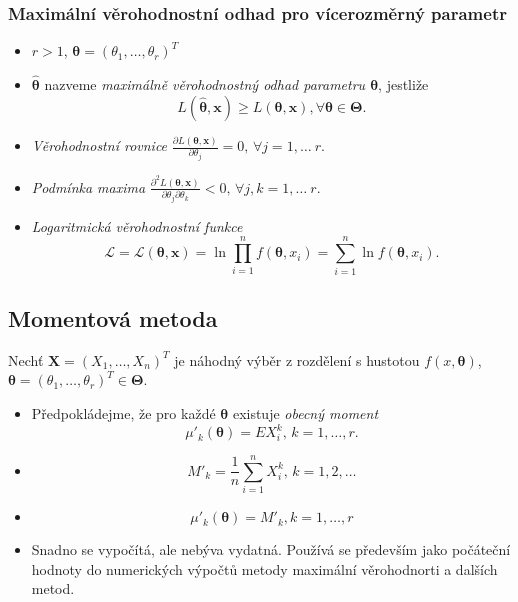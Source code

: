 \subsubsection{Maximální věrohodnostní odhad pro vícerozměrný parametr}
\begin{itemize}
\item $r>1$, $\pmb{\theta}=\left(\theta_1,\ldots,\theta_r\right)^T$
\item $\hat{\pmb{\theta}}$ nazveme \textit{maximálně věrohodnostný odhad parametru $\pmb{\theta}$}, jestliže $$L \left(\hat{\pmb{\theta}}, \mathbf{x} \right) \geq L \left(\pmb{\theta}, \mathbf{x} \right), \forall \pmb{\theta} \in \pmb{\Theta}.$$
\item \textit{Věrohodnostní rovnice} $\frac{\partial L \left(\pmb{\theta}, \mathbf{x} \right)}{\partial \theta_j} = 0,\, \forall j=1,\ldots\ r.$
\item \textit{Podmínka maxima} $\frac{\partial^2 L \left(\pmb{\theta}, \mathbf{x} \right)}{\partial \theta_j \partial \theta_k} < 0,\, \forall j,k=1,\ldots\ r.$
\item \textit{Logaritmická věrohodnostní funkce} $$\mathcal{L} = \mathcal{L} \left(\pmb{\theta}, \mathbf{x} \right) = \ln \prod_{i=1}^{n} f\left(\pmb{\theta},x_i \right) = \sum_{i=1}^{n} \ln f\left(\pmb{\theta},x_i \right).$$
\end{itemize}

\subsection{Momentová metoda}
Nechť $\mathbf{X}=\left(X_1,\ldots,X_n\right)^T$ je náhodný výběr z rozdělení s hustotou $f\left( x,\pmb{\theta}\right)$, $\pmb{\theta}=\left(\theta_1,\ldots,\theta_r\right)^T \in \pmb{\Theta}$.
\begin{itemize}
\item Předpokládejme, že pro každé $\pmb{\theta}$ existuje \textit{obecný moment} $$\mu'_k\left(\pmb{\theta}\right) = EX_{i}^{k}, \, k=1,\ldots,r.$$
\item {} $$M'_k = \frac{1}{n} \sum_{i=1}^{n} X_{i}^{k}, \, k=1,2,\ldots$$
\item {} $$\mu'_k\left(\pmb{\theta}\right)  = M'_k , k=1,\ldots,r$$
\item Snadno se vypočítá, ale nebýva vydatná. Používá se především jako počáteční hodnoty do numerických výpočtů metody maximální věrohodnorti a dalších metod.
\end{itemize}

